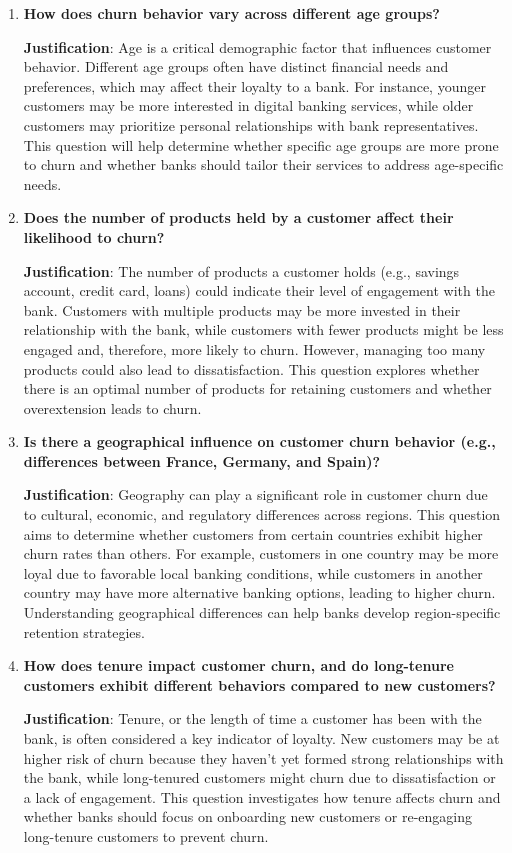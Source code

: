 \documentclass[12pt]{article}
\begin{document}
\begin{enumerate}
    \item \textbf{How does churn behavior vary across different age groups?}
    
    \textbf{Justification}: Age is a critical demographic factor that influences customer behavior. Different age groups often have distinct financial needs and preferences, which may affect their loyalty to a bank. For instance, younger customers may be more interested in digital banking services, while older customers may prioritize personal relationships with bank representatives. This question will help determine whether specific age groups are more prone to churn and whether banks should tailor their services to address age-specific needs.
    
    \item \textbf{Does the number of products held by a customer affect their likelihood to churn?}
    
    \textbf{Justification}: The number of products a customer holds (e.g., savings account, credit card, loans) could indicate their level of engagement with the bank. Customers with multiple products may be more invested in their relationship with the bank, while customers with fewer products might be less engaged and, therefore, more likely to churn. However, managing too many products could also lead to dissatisfaction. This question explores whether there is an optimal number of products for retaining customers and whether overextension leads to churn.
    
    \item \textbf{Is there a geographical influence on customer churn behavior (e.g., differences between France, Germany, and Spain)?}
    
    \textbf{Justification}: Geography can play a significant role in customer churn due to cultural, economic, and regulatory differences across regions. This question aims to determine whether customers from certain countries exhibit higher churn rates than others. For example, customers in one country may be more loyal due to favorable local banking conditions, while customers in another country may have more alternative banking options, leading to higher churn. Understanding geographical differences can help banks develop region-specific retention strategies.
    
    \item \textbf{How does tenure impact customer churn, and do long-tenure customers exhibit different behaviors compared to new customers?}
    
    \textbf{Justification}: Tenure, or the length of time a customer has been with the bank, is often considered a key indicator of loyalty. New customers may be at higher risk of churn because they haven't yet formed strong relationships with the bank, while long-tenured customers might churn due to dissatisfaction or a lack of engagement. This question investigates how tenure affects churn and whether banks should focus on onboarding new customers or re-engaging long-tenure customers to prevent churn.
    
\end{enumerate}
\end{document}
